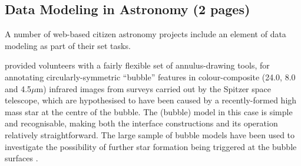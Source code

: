 \documentclass{ar2e}
\begin{document}
\subsection{Data Modeling in Astronomy (2 pages)}
\label{sec:model:astro}

A number of  web-based citizen astronomy projects include an element of data
modeling as part of their set tasks. 


\citet{SimpsonEtal2012} provided volunteers with a fairly flexible set of
annulus-drawing tools, for annotating circularly-symmetric ``bubble'' features
in colour-composite (24.0, 8.0 and  4.5$\mu$m) infrared images from surveys
carried out by the Spitzer space telescope, which are hypothesised to have
been caused by a recently-formed high mass star at the centre of the bubble.
The (bubble) model in this case is simple and recognisable, making both the
interface constructions and its operation relatively straightforward. The
large sample of  bubble models have been used to investigate the possibility
of further star formation being triggered at the bubble surfaces
\citep{KendrewEtal2012}.


\end{document}

